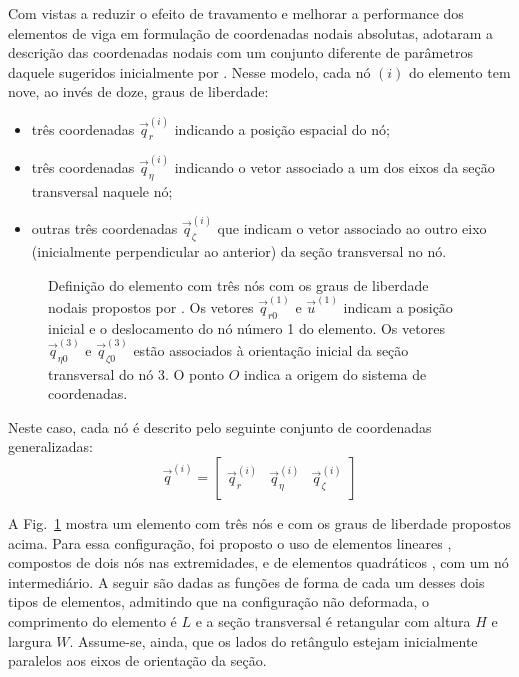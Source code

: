 Com vistas a reduzir o efeito de travamento e melhorar a performance dos elementos de viga em formulação de coordenadas nodais absolutas,
 adotaram a descrição das coordenadas nodais com um conjunto diferente de parâmetros daquele sugeridos inicialmente
por . Nesse modelo, cada nó $(i)$ do elemento tem nove, ao invés de doze, graus de liberdade:
\begin{itemize}
    \item três coordenadas $\vec{q}_{r}^{(i)}$ indicando a posição espacial do nó;
    \item três coordenadas $\vec{q}_{\eta}^{(i)}$ indicando o vetor associado a um dos eixos da seção transversal naquele nó;
    \item outras três coordenadas $\vec{q}_{\zeta}^{(i)}$ que indicam o vetor associado ao outro eixo (inicialmente perpendicular ao anterior) da seção transversal no nó.
\end{itemize}

\begin{figure}[h]
    \centering
    \caption{Definição do elemento com três nós com os graus de liberdade nodais propostos por . Os vetores $\vec{q}_{r0}^{(1)}$ e $\vec{u}^{(1)}$ indicam a posição inicial e o deslocamento do nó número 1 do elemento. Os vetores $\vec{q}_{\eta 0}^{(3)}$ e $\vec{q}_{\zeta 0}^{(3)}$ estão associados à orientação inicial da seção transversal do nó 3. O ponto $O$ indica a origem do sistema de coordenadas.\label{fig: element definition}}
\end{figure}

Neste caso, cada nó é descrito pelo seguinte conjunto de coordenadas generalizadas:
\begin{equation}
    \vec{q}^{(i)} = \begin{bmatrix}
        \vec{q}_{r}^{(i)} & \vec{q}_{\eta}^{(i)} & \vec{q}_{\zeta}^{(i)}
    \end{bmatrix} \label{eq: coord_nodais_nachba}
\end{equation}

A Fig.~\ref{fig: element definition} mostra um elemento com três nós e com os graus de liberdade propostos acima. Para essa configuração, 
foi proposto o uso de elementos lineares \cite{matikainen_elimination_2010,nachbagauer_new_2011}, compostos de dois nós nas extremidades, e de elementos quadráticos \cite{nachbagauer_structural_2013}, com um nó intermediário. A seguir são dadas as funções de forma de
cada um desses dois tipos de elementos, admitindo que na configuração não deformada, o comprimento do elemento é $L$ e a seção transversal é retangular com altura $H$ e largura $W$. Assume-se, ainda, que os lados do retângulo estejam inicialmente paralelos aos eixos de orientação da seção.

